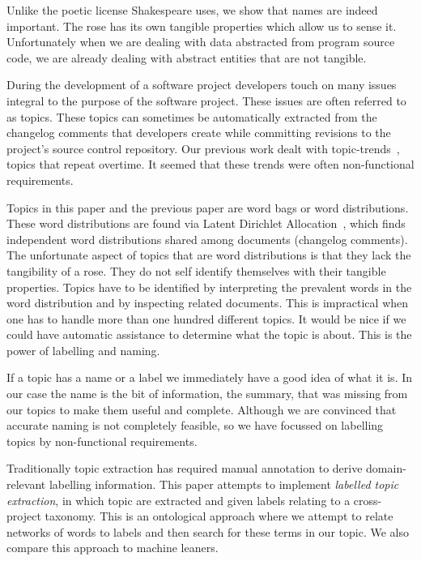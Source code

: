 \documentclass{acm_proc_article-sp}
\begin{document}
Unlike the poetic license Shakespeare uses, we show that names are indeed important. The rose has its own tangible properties which allow us to sense it. Unfortunately when we are dealing with data abstracted from program source code, we are already dealing with abstract entities that are not tangible.

During the development of a software project developers touch on many issues integral to the purpose of the software project. These issues are often referred to as topics. These topics can sometimes be automatically extracted from the changelog comments that developers create while committing revisions to the project's source control repository. Our previous work dealt with topic-trends~\cite{Hindle09ICSM}, topics that repeat overtime. It seemed that these trends were often non-functional requirements. 

Topics in this paper and the previous paper are word bags or word distributions. These word distributions are found via Latent Dirichlet Allocation~\cite{Blei2003}, which finds independent word distributions shared among documents (changelog comments). The unfortunate aspect of topics that are word distributions is that they lack the tangibility of a rose. They do not self identify themselves with their tangible properties. Topics have to be identified by interpreting the prevalent words in the word distribution and by inspecting related documents. This is impractical when one has to handle more than one hundred different topics. It would be nice if we could have automatic assistance to determine what the topic is about. This is the power of labelling and naming.

If a topic has a name or a label we immediately have a good idea of  what it is. In our case the name is the bit of information, the summary, that was missing from our topics to make them useful and complete. Although we are convinced that accurate naming is not completely feasible, so we have focussed on labelling topics by non-functional requirements.


Traditionally topic extraction has required manual annotation to derive domain-relevant labelling information. This paper attempts to implement \emph{labelled topic extraction}, in which topic are extracted and given labels relating to a cross-project taxonomy. This is an ontological approach where we attempt to relate networks of words to labels and then search for these terms in our topic. We also compare this approach to machine leaners.
\end{document}
